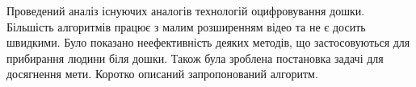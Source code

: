 \chapterConclusion

Проведений аналіз існуючих аналогів технологій оцифровування дошки.
Більшість алгоритмів працює з малим розширенням відео та не є
досить швидкими. Було показано неефективність деяких методів,
що застосовуються для прибирання людини біля дошки.
Також була зроблена постановка задачі для досягнення мети.
Коротко описаний запропонований алгоритм.